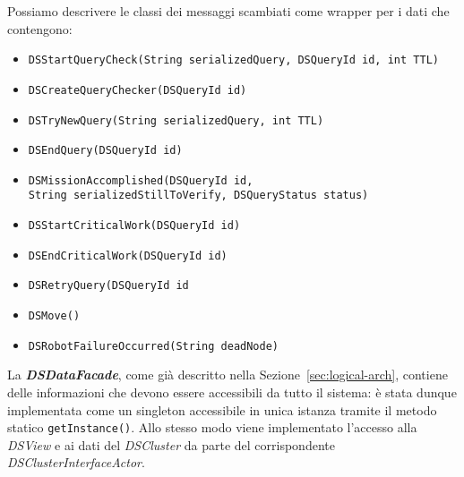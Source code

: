 Possiamo descrivere le classi dei messaggi scambiati come
wrapper per i dati che contengono:
\begin{itemize}
\item \texttt{DSStartQueryCheck(String serializedQuery,
  DSQueryId id, int TTL)}
\item \texttt{DSCreateQueryChecker(DSQueryId id)}
\item \texttt{DSTryNewQuery(String serializedQuery, int TTL)}
\item \texttt{DSEndQuery(DSQueryId id)}
\item \texttt{DSMissionAccomplished(DSQueryId id,\\
  \phantom{....}
  String serializedStillToVerify, DSQueryStatus status)}
\item \texttt{DSStartCriticalWork(DSQueryId id)}
\item \texttt{DSEndCriticalWork(DSQueryId id)}
\item \texttt{DSRetryQuery(DSQueryId id}
\item \texttt{DSMove()}
\item \texttt{DSRobotFailureOccurred(String deadNode)}
\end{itemize}

La \textbf{\emph{DSDataFacade}}, come già descritto nella
Sezione~\ref{sec:logical-arch}, contiene delle informazioni che devono
essere accessibili da tutto il sistema: è stata dunque implementata
come un singleton accessibile in unica istanza tramite il metodo statico
\texttt{getInstance()}.
Allo stesso modo viene implementato l'accesso alla \emph{DSView} e
ai dati del \emph{DSCluster} da parte del corrispondente
\emph{DSClusterInterfaceActor}.\\

